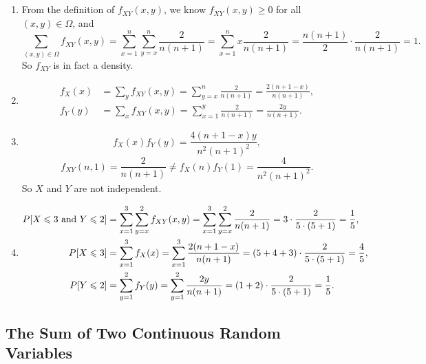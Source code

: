 \documentclass[11pt,a4paper]{article}
\author{Group 37}
\subtitle{Assignment}
\begin{document}
\maketitle

\subsection{}

\begin{enumerate}[label=\roman*)]
\item
From the definition of $f_{XY}(x,y)$, we know $f_{XY}(x,y)\geqslant0$ for all $(x,y)\in\Omega$, and
$$\sum_{(x,y)\in\Omega}f_{XY}(x,y)=\sum_{x=1}^n\sum_{y=x}^n\frac{2}{n(n+1)}=\sum_{x=1}^nx\frac{2}{n(n+1)}=\frac{n(n+1)}{2}\cdot\frac{2}{n(n+1)}=1.$$
So $f_{XY}$ is in fact a density.
\item
\begin{align*}
f_X(x)&=\sum_yf_{XY}(x,y)=\sum_{y=x}^n\frac{2}{n(n+1)}=\frac{2(n+1-x)}{n(n+1)},\\
f_Y(y)&=\sum_xf_{XY}(x,y)=\sum_{x=1}^y\frac{2}{n(n+1)}=\frac{2y}{n(n+1)}.
\end{align*}
\item
$$f_X(x)f_Y(y)=\frac{4(n+1-x)y}{n^2(n+1)^2},$$
$$f_{XY}(n,1)=\frac{2}{n(n+1)}\neq f_X(n)f_Y(1)=\frac{4}{n^2(n+1)^2}.$$
So $X$ and $Y$ are not independent.
\item
\begin{align*}
P[X\leqslant3{\rm\ and\ }Y\leqslant2]&=\sum_{x=1}^3\sum_{y=x}^2f_{XY}(x,y)=\sum_{x=1}^3\sum_{y=x}^2\frac{2}{n(n+1)}=3\cdot\frac{2}{5\cdot(5+1)}=\frac{1}{5},\\
P[X\leqslant3]&=\sum_{x=1}^3f_X(x)=\sum_{x=1}^3\frac{2(n+1-x)}{n(n+1)}=(5+4+3)\cdot\frac{2}{5\cdot(5+1)}=\frac{4}{5},\\
P[Y\leqslant2]&=\sum_{y=1}^2f_Y(y)=\sum_{y=1}^2\frac{2y}{n(n+1)}=(1+2)\cdot\frac{2}{5\cdot(5+1)}=\frac{1}{5}.
\end{align*}
\end{enumerate}

\subsection{The Sum of Two Continuous Random Variables}
\end{document}
